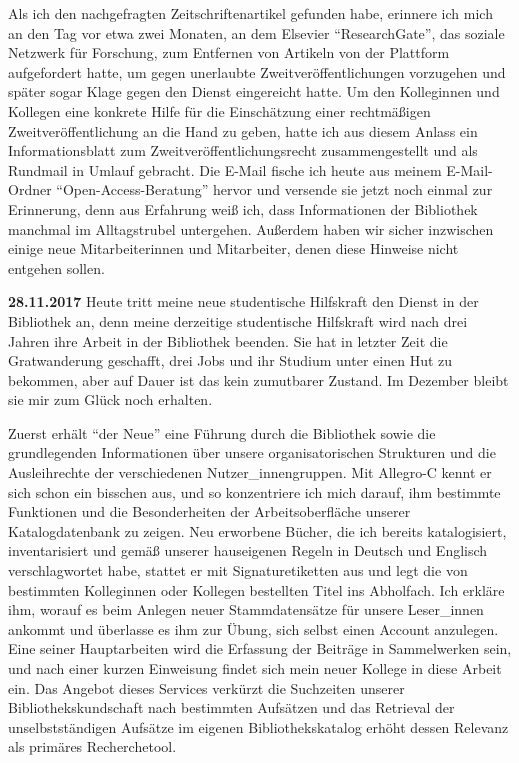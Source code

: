 \documentclass[a4paper,
fontsize=11pt,
oneside,
numbers=noperiodatend,
parskip=half-,
bibliography=totoc,
final
]{scrartcl}
\begin{document}
Als ich den nachgefragten Zeitschriftenartikel gefunden habe, erinnere
ich mich an den Tag vor etwa zwei Monaten, an dem Elsevier
\enquote{ResearchGate}, das soziale Netzwerk für Forschung, zum
Entfernen von Artikeln von der Plattform aufgefordert hatte, um gegen
unerlaubte Zweitveröffentlichungen vorzugehen und später sogar Klage
gegen den Dienst eingereicht hatte. Um den Kolleginnen und Kollegen eine
konkrete Hilfe für die Einschätzung einer rechtmäßigen
Zweitveröffentlichung an die Hand zu geben, hatte ich aus diesem Anlass
ein Informationsblatt zum Zweitveröffentlichungsrecht zusammengestellt
und als Rundmail in Umlauf gebracht. Die E-Mail fische ich heute aus
meinem E-Mail-Ordner \enquote{Open-Access-Beratung} hervor und versende
sie jetzt noch einmal zur Erinnerung, denn aus Erfahrung weiß ich, dass
Informationen der Bibliothek manchmal im Alltagstrubel untergehen.
Außerdem haben wir sicher inzwischen einige neue Mitarbeiterinnen und
Mitarbeiter, denen diese Hinweise nicht entgehen sollen.

\textbf{28.11.2017} Heute tritt meine neue studentische Hilfskraft den
Dienst in der Bibliothek an, denn meine derzeitige studentische
Hilfskraft wird nach drei Jahren ihre Arbeit in der Bibliothek beenden.
Sie hat in letzter Zeit die Gratwanderung geschafft, drei Jobs und ihr
Studium unter einen Hut zu bekommen, aber auf Dauer ist das kein
zumutbarer Zustand. Im Dezember bleibt sie mir zum Glück noch erhalten.

Zuerst erhält \enquote{der Neue} eine Führung durch die Bibliothek sowie
die grundlegenden Informationen über unsere organisatorischen Strukturen
und die Ausleihrechte der verschiedenen Nutzer\_innengruppen. Mit
Allegro-C kennt er sich schon ein bisschen aus, und so konzentriere ich
mich darauf, ihm bestimmte Funktionen und die Besonderheiten der
Arbeitsoberfläche unserer Katalogdatenbank zu zeigen. Neu erworbene
Bücher, die ich bereits katalogisiert, inventarisiert und gemäß unserer
hauseigenen Regeln in Deutsch und Englisch verschlagwortet habe, stattet
er mit Signaturetiketten aus und legt die von bestimmten Kolleginnen
oder Kollegen bestellten Titel ins Abholfach. Ich erkläre ihm, worauf es
beim Anlegen neuer Stammdatensätze für unsere Leser\_innen ankommt und
überlasse es ihm zur Übung, sich selbst einen Account anzulegen. Eine
seiner Hauptarbeiten wird die Erfassung der Beiträge in Sammelwerken
sein, und nach einer kurzen Einweisung findet sich mein neuer Kollege in
diese Arbeit ein. Das Angebot dieses Services verkürzt die Suchzeiten
unserer Bibliothekskundschaft nach bestimmten Aufsätzen und das
Retrieval der unselbstständigen Aufsätze im eigenen Bibliothekskatalog
erhöht dessen Relevanz als primäres Recherchetool.
\end{document}
